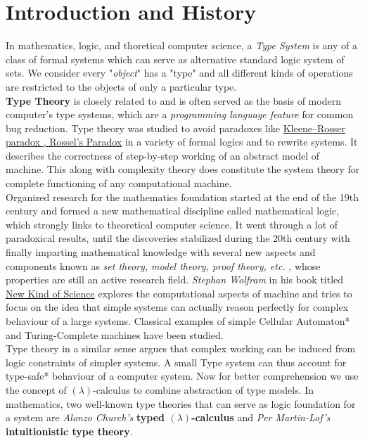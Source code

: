 \chapter{Introduction and History }

In mathematics, logic, and thoretical computer science, a \textit{Type System} is any of a class of formal systems which can serve as alternative standard logic system of sets. We consider every "\textit{object}" has a "type" and all different kinds of operations are restricted to the objects of only a particular type.\\

\textbf{Type Theory} is closely related to and is often served as the basis of modern computer's type systems, which are a \textit{programming language feature} for common bug reduction. Type theory was studied to avoid paradoxes like \underline{Kleene–Rosser paradox , Rossel's Paradox} \cite{russel} in a variety of formal logics and to rewrite systems. It describes the correctness of step-by-step working of an abstract model of machine. This along with complexity theory does constitute the system theory for complete functioning of any computational machine.\\

Organized research for the mathematics foundation started at the end of the 19th century and formed a new mathematical discipline called mathematical logic, which strongly links to theoretical computer science. It went through a lot of paradoxical results, until the discoveries stabilized during the 20th century with finally imparting mathematical knowledge with several new aspects and components known as  \textit{set theory, model theory, proof theory, etc.} , whose properties are still an active research field. \textit{Stephan Wolfram} in his book titled \underline{New Kind of Science} \cite{newkindofscience} explores the computational aspects of machine and tries to focus on the idea that simple systems can actually reason perfectly for complex behaviour of a large systems. Classical examples of simple Cellular Automaton* and Turing-Complete machines have been studied.\\

Type theory in a similar sense argues that complex working can be induced from logic constraints of simpler systems. A small Type system can thus account for type-safe* behaviour of a computer system. Now for better comprehension we use the concept of $(\lambda)$-calculus to combine abstraction of type models. In mathematics, two well-known type theories that can serve as logic foundation for a system are \textit{Alonzo Church's} \textbf{ typed $(\lambda)$-calculus} \cite{typed_lambda} and \textit{Per Martin-Lof's } \textbf{intuitionistic type theory}\cite{per_martin_tt}. 

